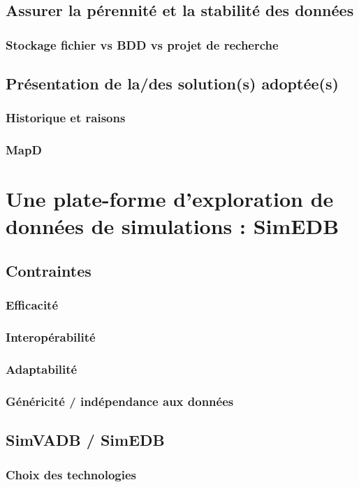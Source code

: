 	\subsection{Assurer la pérennité et la stabilité des données}
		\subsubsection{Stockage fichier vs BDD vs projet de recherche}
	\subsection{Présentation de la/des solution(s) adoptée(s)}
		\subsubsection{Historique et raisons}
		\subsubsection{MapD}
	
\section{Une plate-forme d'exploration de données de simulations : SimEDB}
	\subsection{Contraintes}
		\subsubsection{Efficacité}
		\subsubsection{Interopérabilité}
		\subsubsection{Adaptabilité}
		\subsubsection{Généricité / indépendance aux données}
		
	\subsection{SimVADB / SimEDB}
		\subsubsection{Choix des technologies}
